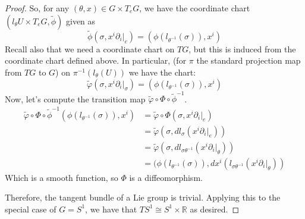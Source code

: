 \documentclass[fontsize=11pt]{scrartcl} %
\numberwithin{equation}{section} %
\numberwithin{figure}{section} %
\numberwithin{table}{section} %
\newcommand{\R}{\mathbb{R}}
\begin{document}
\begin{proof}
So, for any $(\theta, x)\in G\times T_eG$, we have the coordinate chart $(l_{\theta}U\times T_eG,\tilde{\phi})$
given as
\[
\widetilde{\phi}(\sigma,x^i\partial_i|_e) = (\phi(l_{\theta^{-1}}(\sigma)), x^i)
\]
Recall also that we need a coordinate chart on $TG$, but this is induced from the
coordinate chart defined above. In particular, (for $\pi$ the standard projection map
from $TG$ to $G$) on $\pi^{-1}(l_{\theta}(U))$ we have the
chart:
\[
\widetilde{\varphi}(\sigma,x^i\partial_i|_{\sigma}) = (\phi(l_{\theta^{-1}}(\sigma)),x^i)
\]
Now, let's compute the transition map $\widetilde{\varphi}\circ\Phi\circ\widetilde{\phi}^{-1}$.
\[
\begin{aligned}
\widetilde{\varphi}\circ\Phi\circ\widetilde{\phi}^{-1}(\phi(l_{\theta^{-1}}(\sigma)),x^i) &= \widetilde{\varphi}\circ\Phi(\sigma,x^i\partial_i|_e)\\
                &=\widetilde{\varphi}(\sigma,dl_{\sigma}(x^i\partial_i|_e))\\
                &=\widetilde{\varphi}(\sigma,dl_{\sigma\theta^{-1}}(x^i\partial_i|_{\theta}))\\
                &=(\phi(l_{\theta^{-1}}(\sigma)),dx^i(l_{\sigma\theta^{-1}}(x^i\partial_i|_{\theta}))
\end{aligned}
\]
Which is a smooth function, so $\Phi$ is a diffeomorphism.

Therefore, the tangent bundle of a Lie group is trivial.
Applying this to the special case of $G=S^1$, we have that $TS^1\cong S^1\times\R$ as
desired.
\end{proof}
\pagebreak

\end{document}
